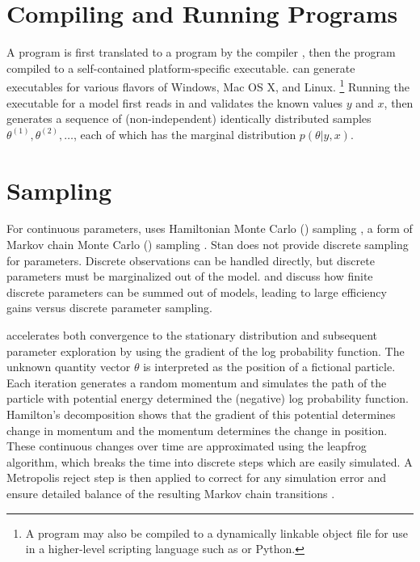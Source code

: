 \section{Compiling and Running \Stan Programs}

A \Stan program is first translated to a \Cpp program by the \Stan
compiler \stanc, then the \Cpp program compiled to a self-contained
platform-specific executable.  \Stan can generate executables for
various flavors of Windows, Mac OS X, and Linux.%
%
\footnote{A \Stan program may also be compiled to a dynamically
  linkable object file for use in a higher-level scripting language
  such as \R or Python.}
%
Running the \Stan executable for a model first reads in and validates
the known values $y$ and $x$, then generates a sequence of
(non-independent) identically distributed samples $\theta^{(1)},
\theta^{(2)}, \ldots$, each of which has the marginal distribution
$p(\theta|y,x)$.


\section{Sampling}

For continuous parameters, \Stan uses Hamiltonian Monte Carlo (\HMC)
sampling \citep{Duane:1987, Neal:1994, Neal:2011}, a form of Markov
chain Monte Carlo (\MCMC) sampling \citep{Metropolis:1953}.  Stan does
not provide discrete sampling for parameters. Discrete observations
can be handled directly, but discrete parameters must be marginalized
out of the model.   and
 discuss how finite discrete parameters
can be summed out of models, leading to large efficiency gains versus
discrete parameter sampling.

\HMC accelerates both convergence to the stationary distribution and
subsequent parameter exploration by using the gradient of the log
probability function.  The unknown quantity vector $\theta$ is
interpreted as the position of a fictional particle.  Each iteration
generates a random momentum and simulates the path of the particle
with potential energy determined the (negative) log probability
function.  Hamilton's decomposition shows that the gradient of this
potential determines change in momentum and the momentum determines
the change in position.  These continuous changes over time are
approximated using the leapfrog algorithm, which breaks the time into
discrete steps which are easily simulated.  A Metropolis reject step
is then applied to correct for any simulation error and ensure
detailed balance of the resulting Markov chain transitions
\citep{Metropolis:1953, Hastings:1970}.

